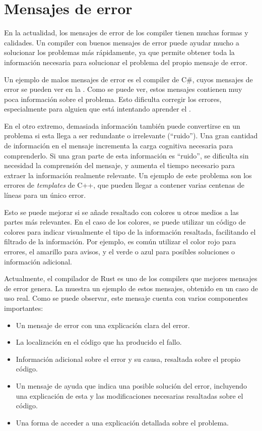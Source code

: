 \section{Mensajes de error}\label{sec:error-messages}

En la actualidad, los mensajes de error de los \gls{compiler} tienen muchas
formas y calidades. Un \gls{compiler} con buenos mensajes de error puede ayudar
mucho a solucionar los problemas más rápidamente, ya que permite obtener toda la
información necesaria para solucionar el problema del propio mensaje de error.

Un ejemplo de malos mensajes de error es el \gls{compiler} de C\#, cuyos mensajes
de error se pueden ver en la . Como se puede ver, estos
mensajes contienen muy poca información sobre el problema. Esto dificulta
corregir los errores, especialmente para alguien que está intentando aprender el
.


En el otro extremo, demasiada información también puede convertirse en un
problema si esta llega a ser redundante o irrelevante (``ruido''). Una gran
cantidad de información en el mensaje incrementa la carga cognitiva necesaria
para comprenderlo. Si una gran parte de esta información es ``ruido'', se
dificulta sin necesidad la comprensión del mensaje, y aumenta el tiempo
necesario para extraer la información realmente relevante. Un ejemplo de este
problema son los errores de \textit{templates} de C++, que pueden llegar a
contener varias centenas de líneas para un único error.

Esto se puede mejorar si se añade resaltado con colores u otros medios a las
partes más relevantes. En el caso de los colores, se puede utilizar un código de
colores para indicar visualmente el tipo de la información resaltada,
facilitando el filtrado de la información. Por ejemplo, es común utilizar el
color rojo para errores, el amarillo para avisos, y el verde o azul para
posibles soluciones o información adicional.

Actualmente, el compilador de Rust \parencite{Rust} es uno de los \glspl{compiler}
que mejores mensajes de error genera. La  muestra un
ejemplo de estos mensajes, obtenido en un caso de uso real. Como se puede
observar, este mensaje cuenta con varios componentes importantes:

\begin{itemize}
    \item Un mensaje de error con una explicación clara del error.
    \item La localización en el código que ha producido el fallo.
    \item Información adicional sobre el error y su causa, resaltada sobre el
    propio código.
    \item Un mensaje de ayuda que indica una posible solución del error,
    incluyendo una explicación de esta y las modificaciones necesarias
    resaltadas sobre el código.
    \item Una forma de acceder a una explicación detallada sobre el problema.
\end{itemize}

